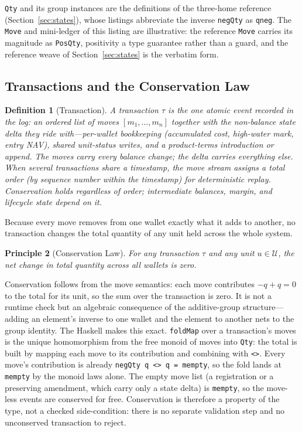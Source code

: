 \documentclass[11pt,a4paper]{article}
\newtheorem{definition}{Definition}[section]
\newtheorem{principle}[definition]{Principle}
\begin{document}
\texttt{Qty} and its group instances are the definitions of the three-home reference (Section~\ref{sec:states}), whose listings abbreviate the inverse \texttt{negQty} as \texttt{qneg}. The \texttt{Move} and mini-ledger of this listing are illustrative: the reference \texttt{Move} carries its magnitude as \texttt{PosQty}, positivity a type guarantee rather than a guard, and the reference weave of Section~\ref{sec:states} is the verbatim form.

\subsection{Transactions and the Conservation Law}

\begin{definition}[Transaction]
\label{def:transaction}
A transaction $\tau$ is the one atomic event recorded in the log: an ordered list of moves $[m_1,\ldots,m_n]$ together with the non-balance state delta they ride with---per-wallet bookkeeping (accumulated cost, high-water mark, entry NAV), shared unit-status writes, and a product-terms introduction or append. The moves carry every balance change; the delta carries everything else. When several transactions share a timestamp, the move stream assigns a total order (by sequence number within the timestamp) for deterministic replay. Conservation holds regardless of order; intermediate balances, margin, and lifecycle state depend on it.
\end{definition}

Because every move removes from one wallet exactly what it adds to another, no transaction changes the total quantity of any unit held across the whole system.

\begin{principle}[Conservation Law]
\label{cond:conservation}
For any transaction $\tau$ and any unit $u \in \mathcal{U}$, the net change in total quantity across all wallets is zero.
\end{principle}

Conservation follows from the move semantics: each move contributes $-q + q = 0$ to the total for its unit, so the sum over the transaction is zero. It is not a runtime check but an algebraic consequence of the additive-group structure---adding an element's inverse to one wallet and the element to another nets to the group identity. The Haskell makes this exact. \texttt{foldMap} over a transaction's moves is the unique homomorphism from the free monoid of moves into \texttt{Qty}: the total is built by mapping each move to its contribution and combining with \texttt{<>}. Every move's contribution is already \texttt{negQty q <> q = mempty}, so the fold lands at \texttt{mempty} by the monoid laws alone. The empty move list (a registration or a preserving amendment, which carry only a state delta) is \texttt{mempty}, so the move-less events are conserved for free. Conservation is therefore a property of the type, not a checked side-condition: there is no separate validation step and no unconserved transaction to reject.
\end{document}
